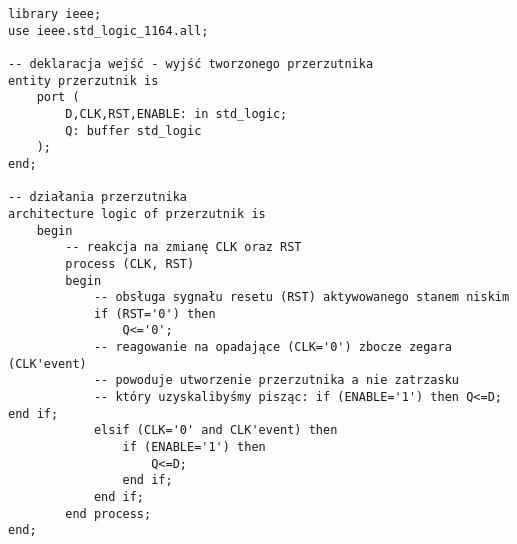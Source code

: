 \documentclass{article}
\begin{document}
\begin{verbatim}
library ieee;
use ieee.std_logic_1164.all;

-- deklaracja wejść - wyjść tworzonego przerzutnika
entity przerzutnik is
    port (
        D,CLK,RST,ENABLE: in std_logic;
        Q: buffer std_logic
    );
end;

-- działania przerzutnika
architecture logic of przerzutnik is
    begin
        -- reakcja na zmianę CLK oraz RST
        process (CLK, RST)
        begin
            -- obsługa sygnału resetu (RST) aktywowanego stanem niskim
            if (RST='0') then
                Q<='0';
            -- reagowanie na opadające (CLK='0') zbocze zegara (CLK'event)
            -- powoduje utworzenie przerzutnika a nie zatrzasku
            -- który uzyskalibyśmy pisząc: if (ENABLE='1') then Q<=D; end if;
            elsif (CLK='0' and CLK'event) then
                if (ENABLE='1') then
                    Q<=D;
                end if;
            end if;
        end process;
end;
\end{verbatim}
\end{document}
